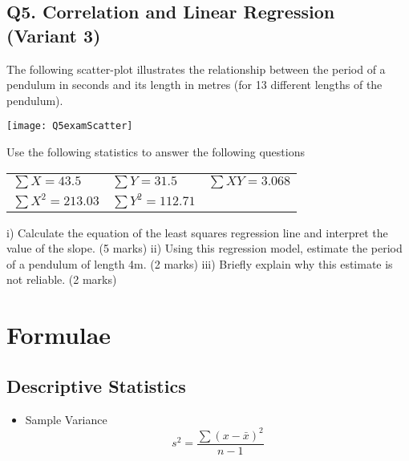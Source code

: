 \documentclass[a4paper,12pt]{article}
\begin{document}
\subsection*{Q5. Correlation and Linear Regression (Variant 3)}
The following scatter-plot illustrates the relationship between the period of a pendulum in seconds and its length in metres (for 13 different lengths of the pendulum).

\begin{center}
\texttt{[image: Q5examScatter]}
\end{center}
Use the following statistics to answer the following questions
%
\begin{center}
\begin{tabular}{lll}
  $\sum X = 43.5$ & $\sum Y = 31.5$ & $\sum XY = 3.068$ \\
  $\sum X^2 = 213.03$ & $\sum Y^2 = 112.71$ &  \\
 \end{tabular}
 \end{center}
i)	Calculate the equation of the least squares regression line and interpret the value of the slope.
(5 marks)
ii)	Using this regression model, estimate the period of a pendulum of length 4m.
(2 marks)
iii)	Briefly explain why this estimate is not reliable.
(2 marks)

\newpage
\section*{Formulae}
\subsection*{Descriptive Statistics}
\begin{itemize}
\item Sample Variance
\begin{equation*}
s^2 = \frac{\sum (x-\bar{x})^2}{n-1}
\end{equation*}
\end{itemize}
\end{document}
